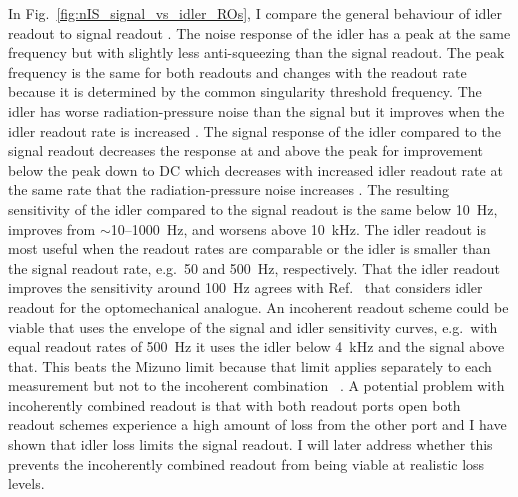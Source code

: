 In Fig.~\ref{fig:nIS_signal_vs_idler_ROs}, I compare the general behaviour of idler readout to signal readout . The noise response of the idler has a peak at the same frequency but with slightly less anti-squeezing  than the signal readout. The peak frequency is the same for both readouts and changes with the readout rate because it is determined by the common singularity threshold frequency. The idler has worse radiation-pressure noise than the signal  but it improves when the idler readout rate is increased . The signal response of the idler compared to the signal readout decreases the response at and above the peak for improvement below the peak down to DC which decreases with increased idler readout rate at the same rate that the radiation-pressure noise increases .
The resulting sensitivity of the idler compared to the signal readout is the same below 10~Hz, improves from $\sim$10--1000~Hz, and worsens above 10~kHz. The idler readout is most useful when the readout rates are comparable or the idler is smaller than the signal readout rate, e.g.\ 50 and 500~Hz, respectively. 
That the idler readout improves the sensitivity around 100~Hz agrees with Ref.~\cite{liEnhancingInterferometerSensitivity2021} that considers idler readout for the optomechanical analogue.
An incoherent readout scheme could be viable that uses the envelope of the signal and idler sensitivity curves, e.g.\ with equal readout rates of 500~Hz it uses the idler below 4~kHz and the signal above that. This beats the Mizuno limit because that limit applies separately to each measurement but not to the incoherent combination ~\cite{}. A potential problem with incoherently combined readout is that with both readout ports open both readout schemes experience a high amount of loss from the other port and I have shown that idler loss limits the signal readout. I will later address whether this prevents the incoherently combined readout from being viable at realistic loss levels. 

